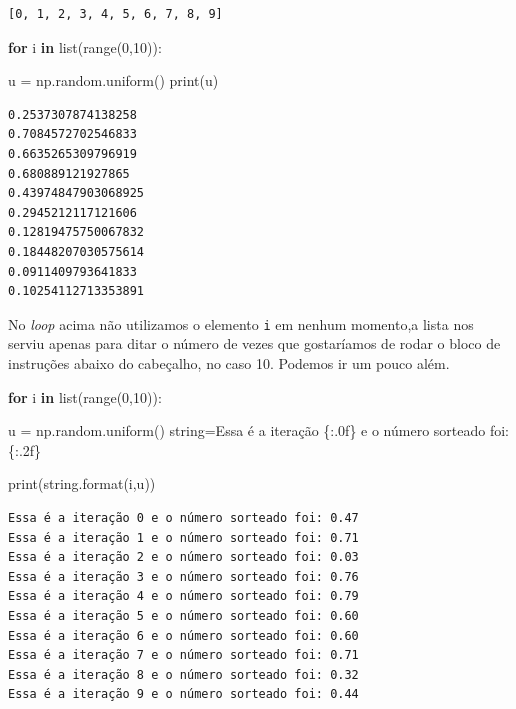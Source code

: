 \documentclass[
  brazilian,
  letterpaper,
  DIV=11,
  numbers=noendperiod]{scrreprt}
\newenvironment{Shaded}{\begin{snugshade}}{\end{snugshade}}
\newcommand{\BuiltInTok}[1]{\textcolor[rgb]{0.00,0.23,0.31}{#1}}
\newcommand{\ControlFlowTok}[1]{\textcolor[rgb]{0.00,0.23,0.31}{\textbf{#1}}}
\newcommand{\DecValTok}[1]{\textcolor[rgb]{0.68,0.00,0.00}{#1}}
\newcommand{\KeywordTok}[1]{\textcolor[rgb]{0.00,0.23,0.31}{\textbf{#1}}}
\newcommand{\NormalTok}[1]{\textcolor[rgb]{0.00,0.23,0.31}{#1}}
\newcommand{\OperatorTok}[1]{\textcolor[rgb]{0.37,0.37,0.37}{#1}}
\newcommand{\SpecialCharTok}[1]{\textcolor[rgb]{0.37,0.37,0.37}{#1}}
\newcommand{\StringTok}[1]{\textcolor[rgb]{0.13,0.47,0.30}{#1}}
\begin{document}
\begin{verbatim}
[0, 1, 2, 3, 4, 5, 6, 7, 8, 9]
\end{verbatim}

\begin{Shaded}
\begin{Highlighting}[]
\ControlFlowTok{for}\NormalTok{ i }\KeywordTok{in} \BuiltInTok{list}\NormalTok{(}\BuiltInTok{range}\NormalTok{(}\DecValTok{0}\NormalTok{,}\DecValTok{10}\NormalTok{)):}
    
\NormalTok{    u }\OperatorTok{=}\NormalTok{ np.random.uniform()}
    \BuiltInTok{print}\NormalTok{(u)}
\end{Highlighting}
\end{Shaded}

\begin{verbatim}
0.2537307874138258
0.7084572702546833
0.6635265309796919
0.680889121927865
0.43974847903068925
0.2945212117121606
0.12819475750067832
0.18448207030575614
0.0911409793641833
0.10254112713353891
\end{verbatim}

No \emph{loop} acima não utilizamos o elemento \texttt{i} em nenhum
momento,a lista nos serviu apenas para ditar o número de vezes que
gostaríamos de rodar o bloco de instruções abaixo do cabeçalho, no caso
10. Podemos ir um pouco além.

\begin{Shaded}
\begin{Highlighting}[]
\ControlFlowTok{for}\NormalTok{ i }\KeywordTok{in} \BuiltInTok{list}\NormalTok{(}\BuiltInTok{range}\NormalTok{(}\DecValTok{0}\NormalTok{,}\DecValTok{10}\NormalTok{)):}
    
\NormalTok{    u }\OperatorTok{=}\NormalTok{ np.random.uniform()}
\NormalTok{    string}\OperatorTok{=}\StringTok{\textquotesingle{}Essa é a iteração }\SpecialCharTok{\{:.0f\}}\StringTok{ e o número sorteado foi: }\SpecialCharTok{\{:.2f\}}\StringTok{\textquotesingle{}}

    \BuiltInTok{print}\NormalTok{(string.}\BuiltInTok{format}\NormalTok{(i,u)) }
\end{Highlighting}
\end{Shaded}

\begin{verbatim}
Essa é a iteração 0 e o número sorteado foi: 0.47
Essa é a iteração 1 e o número sorteado foi: 0.71
Essa é a iteração 2 e o número sorteado foi: 0.03
Essa é a iteração 3 e o número sorteado foi: 0.76
Essa é a iteração 4 e o número sorteado foi: 0.79
Essa é a iteração 5 e o número sorteado foi: 0.60
Essa é a iteração 6 e o número sorteado foi: 0.60
Essa é a iteração 7 e o número sorteado foi: 0.71
Essa é a iteração 8 e o número sorteado foi: 0.32
Essa é a iteração 9 e o número sorteado foi: 0.44
\end{verbatim}
\end{document}
